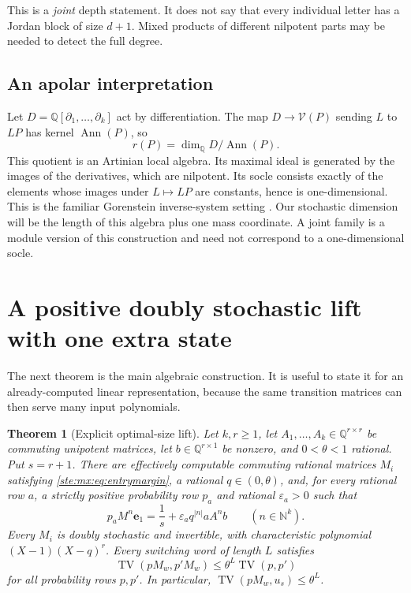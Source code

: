 \documentclass[11pt,letterpaper]{article}
\newtheorem{theorem}{Theorem}[section]
\theoremstyle{definition}
\theoremstyle{remark}
\newcommand{\N}{\mathbb N}
\newcommand{\Q}{\mathbb Q}
\newcommand{\TV}{\operatorname{TV}}
\newcommand{\e}{\mathbf e}
\newcommand{\Ann}{\operatorname{Ann}}
\newcommand{\calV}{\mathcal V}
\begin{document}
This is a \emph{joint} depth statement. It does not say that every individual
letter has a Jordan block of size $d+1$. Mixed products of different nilpotent
parts may be needed to detect the full degree.

\subsection{An apolar interpretation}

Let $D=\Q[\partial_1,\ldots,\partial_k]$ act by differentiation. The map
$D\to\calV(P)$ sending $L$ to $LP$ has kernel $\Ann(P)$, so
\begin{equation}\label{ste:mx:eq:apolar}
 r(P)=\dim_{\Q}D/\Ann(P).
\end{equation}
This quotient is an Artinian local algebra. Its maximal ideal is generated by
the images of the derivatives, which are nilpotent. Its socle consists exactly
of the elements whose images under $L\mapsto LP$ are constants, hence is
one-dimensional. This is the familiar Gorenstein inverse-system setting
\cite{jelisiejew,masuti-rossi}. Our stochastic dimension will be the length of
this algebra plus one mass coordinate. A joint family is a module version of
this construction and need not correspond to a one-dimensional socle.

\section{A positive doubly stochastic lift with one extra state}\label{ste:mx:sec:lift}

The next theorem is the main algebraic construction. It is useful to state it
for an already-computed linear representation, because the same transition
matrices can then serve many input polynomials.

\begin{theorem}[Explicit optimal-size lift]\label{ste:mx:thm:lift}
Let $k,r\geq1$, let $A_1,\ldots,A_k\in\Q^{r\times r}$ be commuting
unipotent matrices, let $b\in\Q^{r\times1}$ be nonzero, and $0<\theta<1$ rational. Put $s=r+1$.
There are effectively computable commuting rational matrices $M_i$ satisfying
\eqref{ste:mx:eq:entrymargin}, a rational $q\in(0,\theta)$, and, for every rational
row $a$, a strictly positive probability row $p_a$ and rational
$\varepsilon_a>0$ such that
\begin{equation}\label{ste:mx:eq:master}
 p_a M^n\e_1=\frac1s+\varepsilon_a q^{|n|}aA^n b
 \qquad(n\in\N^k).
\end{equation}
Every $M_i$ is doubly stochastic and invertible, with characteristic polynomial
$(X-1)(X-q)^r$. Every switching word of length $L$ satisfies
\begin{equation}\label{ste:mx:eq:contraction}
 \TV(pM_w,p'M_w)\leq\theta^L\TV(p,p')
\end{equation}
for all probability rows $p,p'$. In particular,
$\TV(pM_w,u_s)\leq\theta^L$.
\end{theorem}
\end{document}
